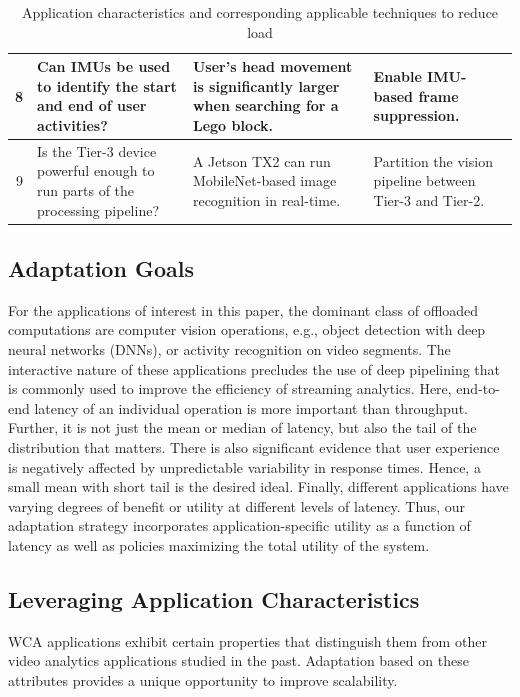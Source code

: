 \begin{table}[]
\begin{tabular}{|r|p{35ex}|p{43ex}|p{32ex}|}
    8&Can IMUs be used to identify the start and end of user activities?
        & User's head movement is significantly larger when searching for a Lego block.
        & Enable IMU-based frame suppression. \\ \hline
    9&Is the Tier-3 device powerful enough to run parts of the processing pipeline?
        & A Jetson TX2 can run MobileNet-based image recognition in real-time.
        & Partition the vision pipeline between Tier-3 and Tier-2.   \\ \hline
    \end{tabular}
\vspace{0.1in}
    \caption{\small Application characteristics and corresponding applicable techniques to reduce load}
    \label{tab:questions-techniques}
\end{table}

\subsection{Adaptation Goals}
 
For the applications of interest in this paper, the dominant class of offloaded
computations are computer vision operations, e.g., object detection with deep
neural networks (DNNs), or activity recognition on video segments. The
interactive nature of these applications precludes the use of deep pipelining
that is commonly used to improve the efficiency of streaming analytics.  Here,
end-to-end latency of an individual operation is more important than
throughput. Further, it is not just the mean or median of latency, but also the
tail of the distribution that matters.  There is also significant evidence that
user experience is negatively affected by unpredictable variability in response
times. Hence, a small mean with short tail is the desired ideal. Finally,
different applications have varying degrees of benefit or utility at different
levels of latency.  Thus, our adaptation strategy incorporates
application-specific utility as a function of latency as well as policies
maximizing the total utility of the system.


\subsection{Leveraging Application Characteristics}
\label{sec:workload-reduction}

WCA applications exhibit certain properties that distinguish them from
other video analytics applications studied in the past.  Adaptation
based on these attributes provides a unique opportunity to improve
scalability.

